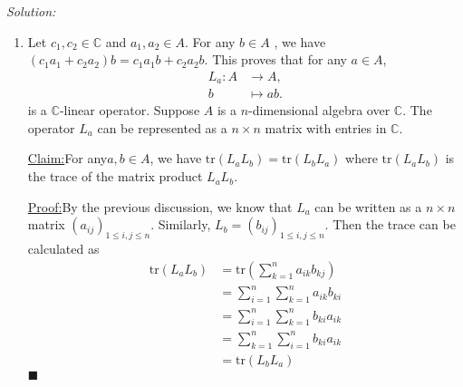 \documentclass[a4paper, 12pt]{article}
\newenvironment{solution}
    {\textit{Solution:}}
    {}
\newenvironment{claim}[1]{\par\noindent\underline{Claim:}\space#1}{}
\newenvironment{claimproof}[1]{\par\noindent\underline{Proof:}\space#1}{\hfill $\blacksquare$}
\newcommand{\tr}{\text{tr}}
\begin{document}
\begin{solution}
\begin{enumerate}[(1)]
\item Let \(c_1,c_2\in \mathbb{C}\) and \(a_1,a_2\in A\). For any \(b\in A\) , we have \((c_1a_1+c_2a_2)b=c_1a_1b+c_2a_2b\). This proves that for any \(a\in A\), 
\begin{align*}
    L_a:A&\rightarrow A,\\ 
        b&\mapsto ab.
\end{align*}
is a \(\mathbb{C}\)-linear operator. Suppose \(A\) is a \(n\)-dimensional algebra over \(\mathbb{C}\). The operator \(L_a\) can be represented as a \(n\times n\) matrix with entries in \(\mathbb{C}\). 
\begin{claim}
For any\(a,b\in A\), we have \(\tr (L_aL_b)=\tr(L_bL_a)\) where \(\tr(L_aL_b)\) is the trace of the matrix product \(L_aL_b\). 
\end{claim}
\begin{claimproof}
By the previous discussion, we know that \(L_a\) can be written as a \(n\times n\) matrix \((a_{ij})_{1\leq i,j\leq n}\). Similarly, \(L_b=(b_{ij})_{1\leq i,j\leq n}\). Then the trace can be calculated as 
\begin{align*}
    \tr(L_aL_b)&=\tr(\sum_{k=1}^{n}a_{ik}b_{kj})\\ 
               &=\sum_{i=1}^{n}\sum_{k=1}^{n}a_{ik}b_{ki}\\ 
               &=\sum_{i=1}^{n}\sum_{k=1}^{n}b_{ki}a_{ik}\\ 
               &=\sum_{k=1}^{n}\sum_{i=1}^{n}b_{ki}a_{ik}\\ 
               &=\tr(L_bL_a)
\end{align*}
\end{claimproof}


\end{enumerate}
\end{solution}
\end{document}
